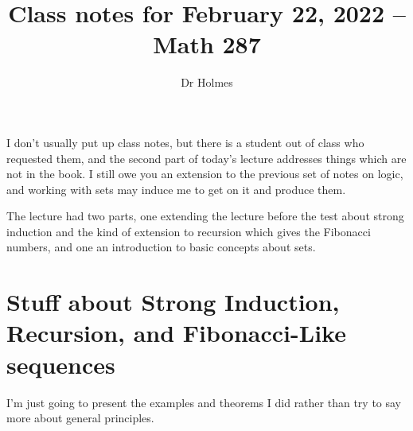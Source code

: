 \documentclass[12pt]{article}
\title{Class notes for February 22, 2022 -- Math 287}
\author{Dr Holmes}
\begin{document}
\maketitle

I don't usually put up class notes, but there is a student out of class who requested them, and the second part of today's lecture addresses things which are not in the book.  I still owe you an extension to the previous set of notes on logic, and working with sets may induce me to get on it and produce them.

The lecture had two parts, one extending the lecture before the test about strong induction and the kind of extension to recursion which gives the Fibonacci numbers, and one an introduction to basic concepts about sets.

\section{Stuff about Strong Induction, Recursion, and Fibonacci-Like sequences}

I'm just going to present the examples and theorems I did rather than try to say more about general principles.
\end{document}
